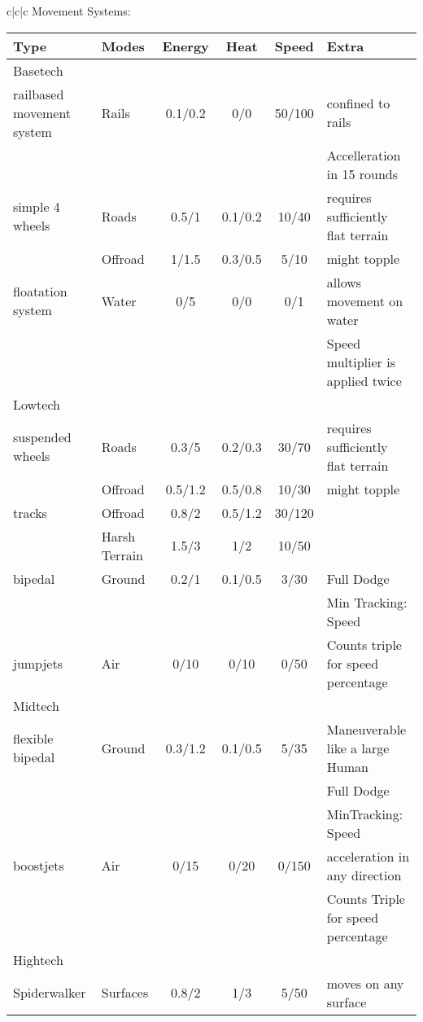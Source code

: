 \documentclass{article}
\begin{document}
\begin{tabular}{c|c|c}
    Movement Systems:\\
    \begin{tabular}{l|lcccl}
        Type    &Modes &Energy &Heat &Speed &Extra\\
        \hline
        Basetech\\
        railbased movement system & Rails &0.1/0.2&0/0&50/100& confined to rails\\
        &&&&&Accelleration in 15 rounds\\
        simple 4 wheels           & Roads &0.5/1 &0.1/0.2& 10/40 & requires sufficiently flat terrain \\
        & Offroad&1/1.5&0.3/0.5& 5/10 & might topple\\
        floatation system         & Water & 0/5  &  0/0  & 0/1   & allows movement on water\\
        &       &     &       &       & Speed multiplier is applied twice\\
        \hline
        Lowtech\\
        suspended wheels          & Roads &0.3/5 &0.2/0.3& 30/70 & requires sufficiently flat terrain \\
        & Offroad&0.5/1.2&0.5/0.8& 10/30 & might topple\\
        tracks                    & Offroad&0.8/2&0.5/1.2& 30/120 &\\
        & Harsh Terrain&1.5/3&1/2& 10/50 &\\
        bipedal                   & Ground &0.2/1&0.1/0.5& 3/30 & Full Dodge\\
        &&&&&Min Tracking: Speed\\
        jumpjets                  & Air &0/10&0/10&0/50& Counts triple for speed percentage\\
        \hline
        Midtech\\
        flexible bipedal          & Ground &0.3/1.2&0.1/0.5 & 5/35 & Maneuverable like a large Human\\
        &&&&&Full Dodge\\
        &&&&&MinTracking: Speed\\
        boostjets                 & Air &0/15 &0/20&0/150& acceleration in any direction\\
        &&&&&Counts Triple for speed percentage\\
        \hline Hightech\\
        Spiderwalker              & Surfaces &0.8/2 &1/3& 5/50 &moves on any surface\\

\end{tabular}
\end{tabular}
\end{document}
